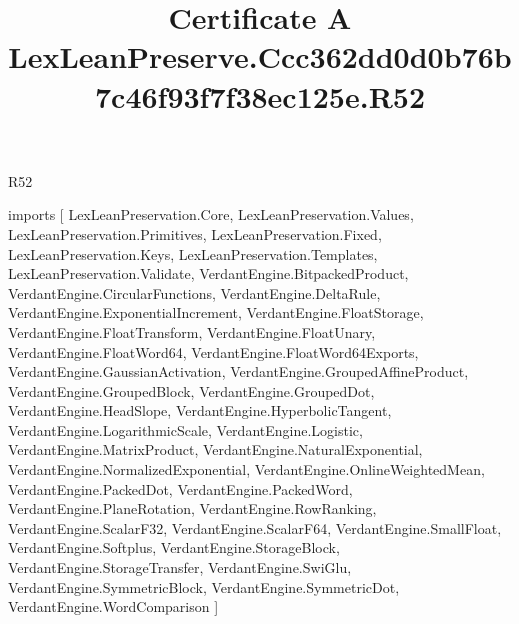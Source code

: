 \begin{lexlean}{R52}
\title{Certificate A LexLeanPreserve.Ccc362dd0d0b76b7c46f93f7f38ec125e.R52}
\begin{coremodule}
imports [
  LexLeanPreservation.Core,
  LexLeanPreservation.Values,
  LexLeanPreservation.Primitives,
  LexLeanPreservation.Fixed,
  LexLeanPreservation.Keys,
  LexLeanPreservation.Templates,
  LexLeanPreservation.Validate,
  VerdantEngine.BitpackedProduct,
  VerdantEngine.CircularFunctions,
  VerdantEngine.DeltaRule,
  VerdantEngine.ExponentialIncrement,
  VerdantEngine.FloatStorage,
  VerdantEngine.FloatTransform,
  VerdantEngine.FloatUnary,
  VerdantEngine.FloatWord64,
  VerdantEngine.FloatWord64Exports,
  VerdantEngine.GaussianActivation,
  VerdantEngine.GroupedAffineProduct,
  VerdantEngine.GroupedBlock,
  VerdantEngine.GroupedDot,
  VerdantEngine.HeadSlope,
  VerdantEngine.HyperbolicTangent,
  VerdantEngine.LogarithmicScale,
  VerdantEngine.Logistic,
  VerdantEngine.MatrixProduct,
  VerdantEngine.NaturalExponential,
  VerdantEngine.NormalizedExponential,
  VerdantEngine.OnlineWeightedMean,
  VerdantEngine.PackedDot,
  VerdantEngine.PackedWord,
  VerdantEngine.PlaneRotation,
  VerdantEngine.RowRanking,
  VerdantEngine.ScalarF32,
  VerdantEngine.ScalarF64,
  VerdantEngine.SmallFloat,
  VerdantEngine.Softplus,
  VerdantEngine.StorageBlock,
  VerdantEngine.StorageTransfer,
  VerdantEngine.SwiGlu,
  VerdantEngine.SymmetricBlock,
  VerdantEngine.SymmetricDot,
  VerdantEngine.WordComparison
]


\end{coremodule}
\end{lexlean}
